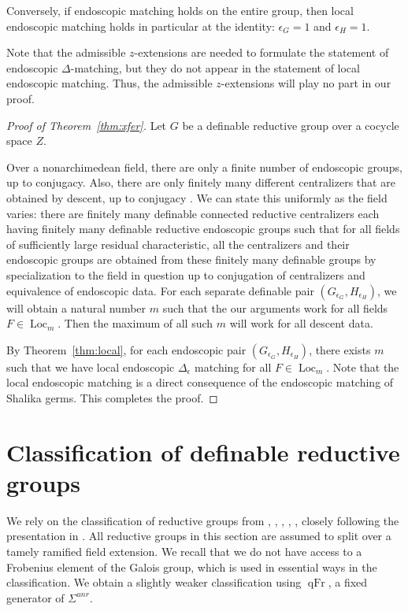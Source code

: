 \documentclass[12pt]{amsart}
\newcommand{\op}[1]{\operatorname{#1}}
\theoremstyle{plain}
\theoremstyle{definition}
\begin{document}
Conversely, if endoscopic matching holds on the entire group, then
local endoscopic matching holds in particular at the identity:
$\epsilon_G = 1$ and $\epsilon_H =1$.

Note that the admissible $z$-extensions are needed to formulate the
statement of endoscopic $\Delta$-matching, but they do not appear in
the statement of local endoscopic matching.  Thus, the admissible
$z$-extensions will play no part in our proof.

\begin{proof}[Proof of Theorem~\ref{thm:xfer}] 
Let $G$ be a definable reductive group over a cocycle
  space $Z$.

  Over a nonarchimedean field, there are only a finite number of endoscopic
  groups, up to conjugacy.  Also, there are only finitely many
  different centralizers that are obtained by descent, up to conjugacy
  \cite[\S 2.2]{LSd}.  We can state this uniformly as the field
  varies: there are finitely many definable connected reductive
  centralizers each having finitely many definable reductive
  endoscopic groups such that for all fields of sufficiently large
  residual characteristic, all the centralizers and their endoscopic
  groups are obtained from these finitely many definable groups by
  specialization to the field in question up to conjugation of
  centralizers and equivalence of endoscopic data.  For each separate
  definable pair $(G_{\epsilon_G},H_{\epsilon_H})$, we will obtain a
  natural number $m$ such that the our arguments work for all fields $F\in
  \op{Loc}_m$.  Then the maximum of all such $m$ will work for all
  descent data.

  By Theorem~\ref{thm:local}, for each endoscopic pair
  $(G_{\epsilon_G},H_{\epsilon_H})$, there exists $m$ such that we
  have local endoscopic $\Delta_\epsilon$ matching for all
  $F\in\op{Loc}_m$.  Note that the local endoscopic matching is
  a direct consequence of the endoscopic matching of Shalika germs.  This
  completes the proof.
\end{proof}


\section{Classification of definable reductive groups}
\label{sec:classification}

We rely on the classification of reductive groups from \cite{Gille},
\cite{Tits}, \cite{Sel}, \cite{Petrov}, \cite{reeder2010torsion},
closely following the presentation in \cite{Gross}.  All reductive
groups in this section are assumed to split over a tamely ramified
field extension.  We recall that we do not have access to a
Frobenius element of the Galois group, which is used in essential ways
in the classification.  We obtain a slightly weaker classification
using $\op{qFr}$, a fixed generator of $\Sigma^{unr}$.
\end{document}
